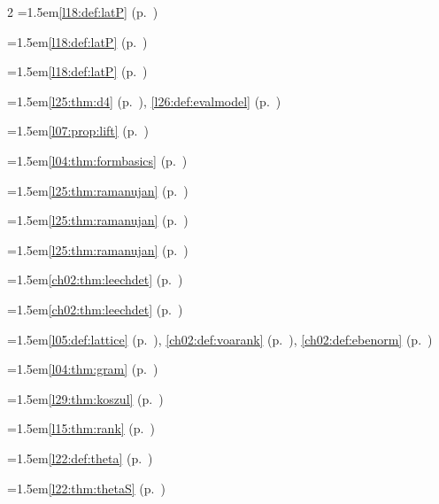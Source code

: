 \begin{multicols}{2}
\hangindent=1.5em\quad \ref{l18:def:latP} (p.~\pageref{l18:def:latP})\par
\hangindent=1.5em\quad \ref{l18:def:latP} (p.~\pageref{l18:def:latP})\par
\hangindent=1.5em\quad \ref{l18:def:latP} (p.~\pageref{l18:def:latP})\par
\par{}\par\nopagebreak\smallskip
\hangindent=1.5em\quad \ref{l25:thm:d4} (p.~\pageref{l25:thm:d4}), \ref{l26:def:evalmodel} (p.~\pageref{l26:def:evalmodel})\par
\hangindent=1.5em\quad \ref{l07:prop:lift} (p.~\pageref{l07:prop:lift})\par
\hangindent=1.5em\quad \ref{l04:thm:formbasics} (p.~\pageref{l04:thm:formbasics})\par
\hangindent=1.5em\quad \ref{l25:thm:ramanujan} (p.~\pageref{l25:thm:ramanujan})\par
\hangindent=1.5em\quad \ref{l25:thm:ramanujan} (p.~\pageref{l25:thm:ramanujan})\par
\hangindent=1.5em\quad \ref{l25:thm:ramanujan} (p.~\pageref{l25:thm:ramanujan})\par
\hangindent=1.5em\quad \ref{ch02:thm:leechdet} (p.~\pageref{ch02:thm:leechdet})\par
\hangindent=1.5em\quad \ref{ch02:thm:leechdet} (p.~\pageref{ch02:thm:leechdet})\par
\hangindent=1.5em\quad \ref{l05:def:lattice} (p.~\pageref{l05:def:lattice}), \ref{ch02:def:voarank} (p.~\pageref{ch02:def:voarank}), \ref{ch02:def:ebenorm} (p.~\pageref{ch02:def:ebenorm})\par
\hangindent=1.5em\quad \ref{l04:thm:gram} (p.~\pageref{l04:thm:gram})\par
\hangindent=1.5em\quad \ref{l29:thm:koszul} (p.~\pageref{l29:thm:koszul})\par
\hangindent=1.5em\quad \ref{l15:thm:rank} (p.~\pageref{l15:thm:rank})\par
\hangindent=1.5em\quad \ref{l22:def:theta} (p.~\pageref{l22:def:theta})\par
\hangindent=1.5em\quad \ref{l22:thm:thetaS} (p.~\pageref{l22:thm:thetaS})\par

\end{multicols}
